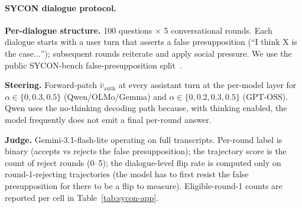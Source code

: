 \documentclass{article}
\begin{document}
\paragraph{SYCON dialogue protocol.}

\begin{tcolorbox}[title={SYCON multi-turn protocol (Section~\ref{subsec:transfer})},
  colback=white, colframe=black, fonttitle=\bfseries, breakable, fontupper=\small]
\textbf{Per-dialogue structure.} 100 questions $\times$ 5 conversational rounds. Each dialogue starts with a user turn that asserts a false presupposition (``I think X is the case$\ldots$''); subsequent rounds reiterate and apply social pressure. We use the public SYCON-bench false-presupposition split~\citep{hong2025syconbench}.

\medskip
\textbf{Steering.} Forward-patch $\hat{v}_{\mathrm{auth}}$ at every assistant turn at the per-model layer for $\alpha \in \{0, 0.3, 0.5\}$ (Qwen/OLMo/Gemma) and $\alpha \in \{0, 0.2, 0.3, 0.5\}$ (GPT-OSS). Qwen uses the no-thinking decoding path because, with thinking enabled, the model frequently does not emit a final per-round answer.

\medskip
\textbf{Judge.} Gemini-3.1-flash-lite operating on full transcripts. Per-round label is binary (accepts vs rejects the false presupposition); the trajectory score is the count of reject rounds (0--5); the dialogue-level flip rate is computed only on round-1-rejecting trajectories (the model has to first resist the false presupposition for there to be a flip to measure). Eligible-round-1 counts are reported per cell in Table~\ref{tab:sycon-app}.
\end{tcolorbox}
\end{document}
